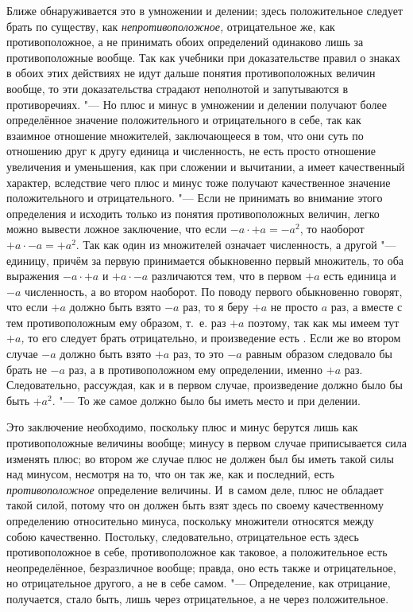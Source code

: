 Ближе обнаруживается это в умножении и делении; здесь положительное следует
брать по существу, как {\em непротивоположное,}
отрицательное же, как противоположное, а не принимать обоих определений
одинаково лишь за противоположные вообще. Так как учебники при
доказательстве правил о знаках в обоих этих действиях не идут дальше
понятия противоположных величин вообще, то эти доказательства страдают
неполнотой и запутываются в противоречиях. "--- Но плюс и минус в умножении и
делении получают более определённое значение положительного и
отрицательного в себе, так как взаимное отношение множителей, заключающееся
в том, что они суть по отношению друг к другу единица и численность, не
есть просто отношение увеличения и уменьшения, как при сложении и
вычитании, а имеет качественный характер, вследствие чего плюс и минус тоже
получают качественное значение положительного и отрицательного. "--- Если не
принимать во внимание этого определения и исходить только из понятия
противоположных величин, легко можно вывести ложное заключение, что если
$-a\cdot+a=-a^2$, то наоборот $+a\cdot-a=+a^2$. Так как один из множителей
означает численность, а другой "--- единицу, причём за первую принимается
обыкновенно первый множитель,
то оба выражения $-a\cdot+a$ и $+a\cdot-a$ различаются тем,
что в первом $+a$ есть единица и $-a$ численность, а во втором наоборот.
По поводу первого обыкновенно говорят, что если $+a$ должно
быть взято $-a$ раз, то я беру $+a$ не просто $a$ раз, а
вместе с тем противоположным ему образом, т.~е. раз $+a$
поэтому, так как мы имеем тут {\em $+a$,} то его следует
брать отрицательно, и произведение есть . Если же во втором случае
$-a$ должно быть взято $+a$ раз, то это $-a$
равным образом следовало бы брать не $-a$ раз, а в
противоположном ему определении, именно $+a$ раз.
Следовательно, рассуждая, как и в первом случае, произведение должно было
бы быть $+a^2$. "--- То же самое должно было бы иметь место и при делении.

Это заключение необходимо, поскольку плюс и минус берутся лишь как
противоположные величины вообще; минусу в первом случае приписывается сила
изменять плюс; во втором же случае плюс не должен был бы иметь такой силы
над минусом, несмотря на то, что он так же, как и последний, есть
{\em противоположное} определение величины. И~в самом
деле, плюс не обладает такой силой, потому что он должен быть взят здесь по
своему качественному определению относительно минуса, поскольку множители
относятся между собою качественно. Постольку, следовательно, отрицательное
есть здесь противоположное в себе, противоположное как таковое, а
положительное есть неопределённое, безразличное вообще; правда, оно есть
также и отрицательное, но отрицательное другого, а не в себе самом. "---
Определение, как отрицание, получается, стало быть, лишь через
отрицательное, а не через положительное.

